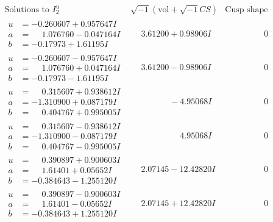 \documentclass[1p]{elsarticle_modified}
\theoremstyle{definition}
\newcommand{\I}{\sqrt{-1}}
\begin{document}
$$\begin{array}{c|c|c}  
\text{Solutions to }I^u_{2}& \I (\text{vol} + \sqrt{-1}CS) & \text{Cusp shape}\\
 \hline 
\begin{aligned}
u &= -0.260607 + 0.957647 I \\
a &= \phantom{-}1.076760 - 0.047164 I \\
b &= -0.17973 + 1.61195 I\end{aligned}
 & \phantom{-}3.61200 + 0.98906 I & \phantom{-0.000000 } 0 \\ \hline\begin{aligned}
u &= -0.260607 - 0.957647 I \\
a &= \phantom{-}1.076760 + 0.047164 I \\
b &= -0.17973 - 1.61195 I\end{aligned}
 & \phantom{-}3.61200 - 0.98906 I & \phantom{-0.000000 } 0 \\ \hline\begin{aligned}
u &= \phantom{-}0.315607 + 0.938612 I \\
a &= -1.310900 + 0.087179 I \\
b &= \phantom{-}0.404767 + 0.995005 I\end{aligned}
 & \phantom{-0.000000 } -4.95068 I & \phantom{-0.000000 } 0 \\ \hline\begin{aligned}
u &= \phantom{-}0.315607 - 0.938612 I \\
a &= -1.310900 - 0.087179 I \\
b &= \phantom{-}0.404767 - 0.995005 I\end{aligned}
 & \phantom{-0.000000 -}4.95068 I & \phantom{-0.000000 } 0 \\ \hline\begin{aligned}
u &= \phantom{-}0.390897 + 0.900603 I \\
a &= \phantom{-}1.61401 + 0.05652 I \\
b &= -0.384643 - 1.255120 I\end{aligned}
 & \phantom{-}2.07145 - 12.42820 I & \phantom{-0.000000 } 0 \\ \hline\begin{aligned}
u &= \phantom{-}0.390897 - 0.900603 I \\
a &= \phantom{-}1.61401 - 0.05652 I \\
b &= -0.384643 + 1.255120 I\end{aligned}
 & \phantom{-}2.07145 + 12.42820 I & \phantom{-0.000000 } 0 \\ \hline\begin{aligned}

\end{aligned}
\end{array}$$
\end{document}
